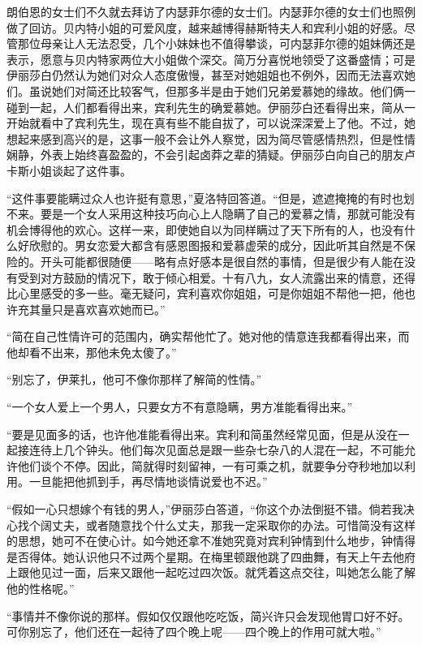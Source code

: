 \par 朗伯恩的女士们不久就去拜访了内瑟菲尔德的女士们。内瑟菲尔德的女士们也照例做了回访。贝内特小姐的可爱风度，越来越博得赫斯特夫人和宾利小姐的好感。尽管那位母亲让人无法忍受，几个小妹妹也不值得攀谈，可内瑟菲尔德的姐妹俩还是表示，愿意与贝内特家两位大小姐做个深交。简万分喜悦地领受了这番盛情；可是伊丽莎白仍然认为她们对众人态度傲慢，甚至对她姐姐也不例外，因而无法喜欢她们。虽说她们对简还比较客气，但那多半是由于她们兄弟爱慕她的缘故。他们俩一碰到一起，人们都看得出来，宾利先生的确爱慕她。伊丽莎白还看得出来，简从一开始就看中了宾利先生，现在真有些不能自拔了，可以说深深爱上了他。不过，她想起来感到高兴的是，这事一般不会让外人察觉，因为简尽管感情热烈，但是性情娴静，外表上始终喜盈盈的，不会引起卤莽之辈的猜疑。伊丽莎白向自己的朋友卢卡斯小姐谈起了这件事。
\par “这件事要能瞒过众人也许挺有意思，”夏洛特回答道。“但是，遮遮掩掩的有时也划不来。要是一个女人采用这种技巧向心上人隐瞒了自己的爱慕之情，那就可能没有机会博得他的欢心。这样一来，即使她自以为同样瞒过了天下所有的人，也没有什么好欣慰的。男女恋爱大都含有感恩图报和爱慕虚荣的成分，因此听其自然是不保险的。开头可能都很随便——略有点好感本是很自然的事情，但是很少有人能在没有受到对方鼓励的情况下，敢于倾心相爱。十有八九，女人流露出来的情意，还得比心里感受的多一些。毫无疑问，宾利喜欢你姐姐，可是你姐姐不帮他一把，他也许充其量只是喜欢喜欢她而已。”
\par “简在自己性情许可的范围内，确实帮他忙了。她对他的情意连我都看得出来，而他却看不出来，那他未免太傻了。”
\par “别忘了，伊莱扎，他可不像你那样了解简的性情。”
\par “一个女人爱上一个男人，只要女方不有意隐瞒，男方准能看得出来。”
\par “要是见面多的话，也许他准能看得出来。宾利和简虽然经常见面，但是从没在一起接连待上几个钟头。他们每次见面总是跟一些杂七杂八的人混在一起，不可能允许他们谈个不停。因此，简就得时刻留神，一有可乘之机，就要争分夺秒地加以利用。一旦能把他抓到手，再尽情地谈情说爱也不迟。”
\par “假如一心只想嫁个有钱的男人，”伊丽莎白答道，“你这个办法倒挺不错。倘若我决心找个阔丈夫，或者随意找个什么丈夫，那我一定采取你的办法。可惜简没有这样的思想，她可不在使心计。如今她还拿不准她究竟对宾利钟情到什么地步，钟情得是否得体。她认识他只不过两个星期。在梅里顿跟他跳了四曲舞，有天上午去他府上跟他见过一面，后来又跟他一起吃过四次饭。就凭着这点交往，叫她怎么能了解他的性格呢。”
\par “事情并不像你说的那样。假如仅仅跟他吃吃饭，简兴许只会发现他胃口好不好。可你别忘了，他们还在一起待了四个晚上呢——四个晚上的作用可就大啦。”
